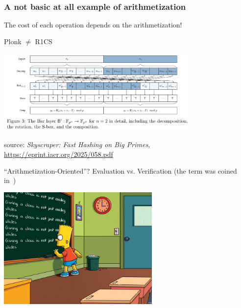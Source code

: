 \documentclass[presentation,aspectratio=1610]{beamer}
\begin{document}
\begin{frame}
  \frametitle{A not basic at all example of arithmetization}
  
  \begin{center}
    The cost of each operation depends on the arithmetization!

    Plonk $\neq$ R1CS
  \end{center}\pause
  
  \begin{center}
    \includegraphics[width=10cm]{./figures/skyscraper}

    \vspace{0.5cm}

    {source: \emph{Skyscraper: Fast Hashing on Big Primes}, \url{https://eprint.iacr.org/2025/058.pdf}}
  \end{center}
\end{frame}


\begin{frame}{``Arithmetization-Oriented''? Evaluation vs. Verification}
  (the term was coined in~\cite{ToSC:AABDS20})
  
  \vfill

  \begin{center}
    \includegraphics[width=8cm]{./figures/simpsons}
  \end{center}
  
  \vfill

\end{frame}
\end{document}
